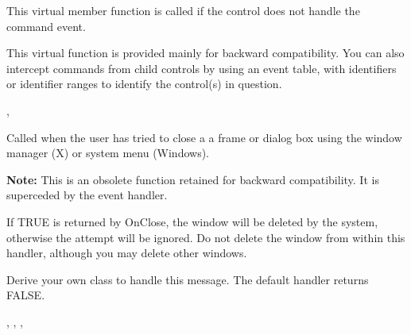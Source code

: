 \label{wxwindowoncommand}


This virtual member function is called if the control does not handle the command event.





This virtual function is provided mainly for backward compatibility. You can also intercept commands
from child controls by using an event table, with identifiers or identifier ranges to identify
the control(s) in question.


,\rtfsp
{}

\label{wxwindowonclose}


Called when the user has tried to close a a frame
or dialog box using the window manager (X) or system menu (Windows).

{\bf Note:} This is an obsolete function retained for backward compatibility.
It is superceded by the  event
handler.


If TRUE is returned by OnClose, the window will be deleted by the system, otherwise the
attempt will be ignored. Do not delete the window from within this handler, although
you may delete other windows.


Derive your own class to handle this message. The default handler returns FALSE.


,\rtfsp
{},\rtfsp
{},\rtfsp
{}

\label{wxwindowonclosewindow}

